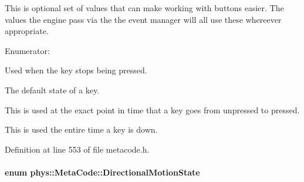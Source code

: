 This is optional set of values that can make working with buttons easier. The values the engine pass via the the event manager will all use these whereever appropriate. \begin{Desc}
\item[Enumerator: ]\par
\begin{description}
\item[{\em 
\hypertarget{classphys_1_1MetaCode_a2fdfb26b3e50ceb0ccc60bfc4c3d6ac2a6b5564408703517f36debd8c423e2dee}{
BUTTON\_\-LIFTING}
\label{classphys_1_1MetaCode_a2fdfb26b3e50ceb0ccc60bfc4c3d6ac2a6b5564408703517f36debd8c423e2dee}
}]Used when the key stops being pressed. \item[{\em 
\hypertarget{classphys_1_1MetaCode_a2fdfb26b3e50ceb0ccc60bfc4c3d6ac2ae275c52779b0f6ec37533af256a70cc3}{
BUTTON\_\-UP}
\label{classphys_1_1MetaCode_a2fdfb26b3e50ceb0ccc60bfc4c3d6ac2ae275c52779b0f6ec37533af256a70cc3}
}]The default state of a key. \item[{\em 
\hypertarget{classphys_1_1MetaCode_a2fdfb26b3e50ceb0ccc60bfc4c3d6ac2a33669b2b9ca814664296da55702e412d}{
BUTTON\_\-PRESSING}
\label{classphys_1_1MetaCode_a2fdfb26b3e50ceb0ccc60bfc4c3d6ac2a33669b2b9ca814664296da55702e412d}
}]This is used at the exact point in time that a key goes from unpressed to pressed. \item[{\em 
\hypertarget{classphys_1_1MetaCode_a2fdfb26b3e50ceb0ccc60bfc4c3d6ac2a5b52ee1db94dbc2db23f3b4c267b5438}{
BUTTON\_\-DOWN}
\label{classphys_1_1MetaCode_a2fdfb26b3e50ceb0ccc60bfc4c3d6ac2a5b52ee1db94dbc2db23f3b4c267b5438}
}]This is used the entire time a key is down. \end{description}
\end{Desc}



Definition at line 553 of file metacode.h.

\hypertarget{classphys_1_1MetaCode_ad6ed6266b5f4219a6f5da29ebe018757}{
\paragraph[{DirectionalMotionState}]{\setlength{\rightskip}{0pt plus 5cm}enum {\bf phys::MetaCode::DirectionalMotionState}}\hfill}
\label{classphys_1_1MetaCode_ad6ed6266b5f4219a6f5da29ebe018757}


